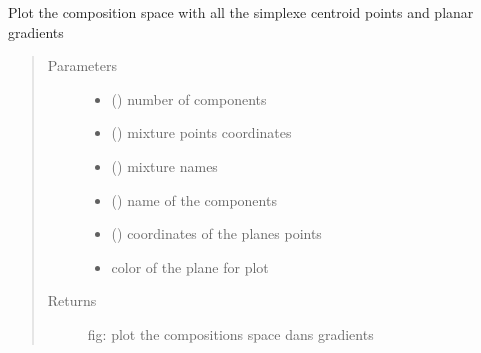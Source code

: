 \documentclass[letterpaper,10pt,english]{sphinxmanual}
\begin{document}
\label{\detokenize{ExperimentsPlannification:module-modules}}

\begin{fulllineitems}
\label{\detokenize{ExperimentsPlannification:modules.plot_compo_space_planes}}
\sphinxAtStartPar
Plot the composition space with all the simplexe centroid points and planar gradients
\begin{quote}\begin{description}
\item[{Parameters}] \leavevmode\begin{itemize}
\item {} 
\sphinxAtStartPar
{} () \textendash{} number of components

\item {} 
\sphinxAtStartPar
{} () \textendash{} mixture points coordinates

\item {} 
\sphinxAtStartPar
{} () \textendash{} mixture names

\item {} 
\sphinxAtStartPar
{} () \textendash{} name of the components

\item {} 
\sphinxAtStartPar
{} () \textendash{} coordinates of the planes points

\item {} 
\sphinxAtStartPar
{} \textendash{} color of the plane for plot

\end{itemize}

\item[{Returns}] \leavevmode
\sphinxAtStartPar
fig: plot the compositions space dans gradients

\end{description}\end{quote}

\end{fulllineitems}
\end{document}
